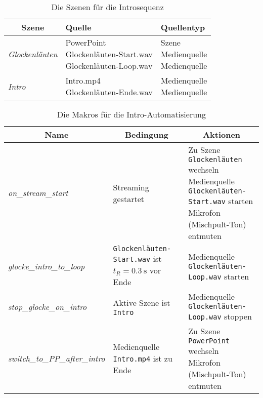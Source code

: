 				\begin{table}
					\caption{Die Szenen für die Introsequenz}
					\centering

					\begin{tabular}{lll}
						\toprule
						\multicolumn{1}{c}{Szene} & Quelle & Quellentyp \\
						\midrule
						\textit{Glockenläuten} & \parbox{0.3\textwidth}{PowerPoint\\Glockenläuten-Start.wav\\Glockenläuten-Loop.wav} & \parbox{0.2\textwidth}{Szene\\Medienquelle\\Medienquelle} \\ \midrule
						\textit{Intro} & \parbox{0.3\textwidth}{Intro.mp4\\Glockenläuten-Ende.wav} & \parbox{0.2\textwidth}{Medienquelle\\Medienquelle} \\
						\bottomrule
					\end{tabular}
				\end{table}

				\begin{table}
					\caption{Die Makros für die Intro-Automatisierung}
					\centering

					\begin{tabular}{lll}
						\toprule
						\multicolumn{1}{c}{Name} & \multicolumn{1}{c}{Bedingung} & \multicolumn{1}{c}{Aktionen} \\
						\midrule
						\textit{on\_stream\_start} & Streaming gestartet & \parbox{0.5\textwidth}{
								Zu Szene \texttt{Glocken\-läuten} wechseln\\
								Medienquelle \texttt{Glocken\-läuten\--Start.wav} starten\\
								Mikrofon (Mischpult-Ton) entmuten
						} \\ \midrule
						\textit{glocke\_intro\_to\_loop} & \parbox{0.25\textwidth}{\texttt{Glocken\-läuten\--Start.wav} ist $t_R = \SI{0,3}{\second}$ vor Ende} & \parbox{0.5\textwidth}{Medienquelle \texttt{Glocken\-läuten\--Loop.wav} starten} \\ \midrule
						\textit{stop\_glocke\_on\_intro} & Aktive Szene ist \texttt{Intro} & \parbox{0.5\textwidth}{Medienquelle \texttt{Glocken\-läuten\--Loop.wav} stoppen} \\ \midrule
						\textit{switch\_to\_PP\_after\_intro} & \parbox{0.25\textwidth}{Medienquelle \texttt{Intro.mp4} ist zu Ende} & \parbox{0.5\textwidth}{
							Zu Szene \texttt{PowerPoint} wechseln\\
							Mikrofon (Mischpult-Ton) entmuten
						} \\
						\bottomrule
					\end{tabular}
				\end{table}
